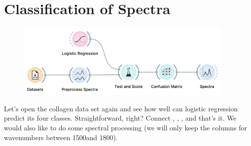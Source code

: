 \chapter{Classification of Spectra}
\label{ch:spectra_classification}

\begin{figure}
    \centering
    \vspace{-3.4cm}
    \includegraphics[width=0.95\textwidth]{sp_classification-fig1.png}
    \label{fig:spectra_classification-fig1}
\end{figure}


Let’s open the collagen data set again and see how well can logistic regression predict its four classes. Straightforward, right? Connect , , ,  and that's it. We would also like to do some spectral processing (we will only keep the columns for wavenumbers between 1500\wn and 1800\wn).

